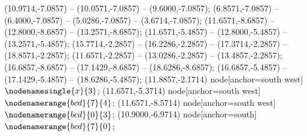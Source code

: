    (10.9714,-7.0857) -- (10.0571,-7.0857) -- (9.6000,-7.0857);
   (6.8571,-7.0857) -- (6.4000,-7.0857) -- (5.0286,-7.0857) -- (3.6714,-7.0857);
   (11.6571,-8.6857) -- (12.8000,-8.6857) -- (13.2571,-8.6857);
   (11.6571,-5.4857) -- (12.8000,-5.4857) -- (13.2571,-5.4857);
   (15.7714,-2.2857) -- (16.2286,-2.2857) -- (17.3714,-2.2857) -- (18.8571,-2.2857);
   (11.6571,-2.2857) -- (13.0286,-2.2857) -- (13.4857,-2.2857);
   (16.6857,-8.6857) -- (17.1429,-8.6857) -- (18.6286,-8.6857);
   (16.6857,-5.4857) -- (17.1429,-5.4857) -- (18.6286,-5.4857);
   (11.8857,-2.1714) node[anchor=south west] {$\nodenamesingle{x}{3}$};
   (11.6571,-5.3714) node[anchor=south west] {$\nodenamerange{bcd}{7}{4}$};
   (11.6571,-8.5714) node[anchor=south west] {$\nodenamerange{bcd}{0}{3}$};
   (10.9000,-6.9714) node[anchor=south] {$\nodenamerange{bcd}{7}{0}$};
